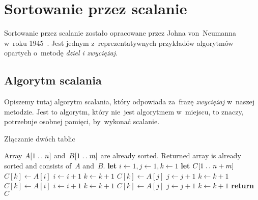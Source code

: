 \section{Sortowanie przez scalanie}

Sortowanie przez scalanie zostało opracowane
przez Johna von~Neumanna w~roku 1945~\cite{merge-sort-wiki}.
Jest jednym z~reprezentatywnych przykładów
algorytmów opartych o~metodę \emph{dziel i zwyciężaj}.

\subsection{Algorytm scalania}
Opiszemy tutaj algorytm scalania, który odpowiada 
za~frazę \emph{zwyciężaj} w~naszej metodzie.
Jest to algorytm, który nie~jest algorytmem w~miejscu,
to znaczy, potrzebuje osobnej pamięci, by~wykonać
scalanie.

\begin{algorithm}
    \label{alg:merge}
    \caption{Złączanie dwóch tablic}
    \begin{algorithmic}[1]
        \Require Array \( A[1 \mathrel{{.}\,{.}}\nobreak n] \) 
        and~\( B[1 \mathrel{{.}\,{.}}\nobreak m] \) are already sorted.
        \Ensure Returned array is already sorted
            and consists of~\( A \) and~\( B \).
            \State \textbf{let} \( i \gets 1, j \gets 1, k \gets 1 \)
            \State \textbf{let} \( C[1 \mathrel{{.}\,{.}}\nobreak n + m] \) 
                    \State \( C[k] \gets A[i] \)
                    \State \( i \gets i + 1 \)
                    \State \( k \gets k + 1 \)
                \Else 
                    \State \( C[k] \gets A[j] \)
                    \State \( j \gets j + 1 \)
                    \State \( k \gets k + 1 \)
                \EndIf
            \EndWhile
                \State \( C[k] \gets A[i] \)
                \State \( i \gets i + 1 \)
                \State \( k \gets k + 1 \)
            \EndWhile
                \State \( C[k] \gets A[j] \)
                \State \( j \gets j + 1 \)
                \State \( k \gets k + 1 \)
            \EndWhile
            \State \textbf{return} \( C \)
        \EndProcedure%
    \end{algorithmic}
\end{algorithm}